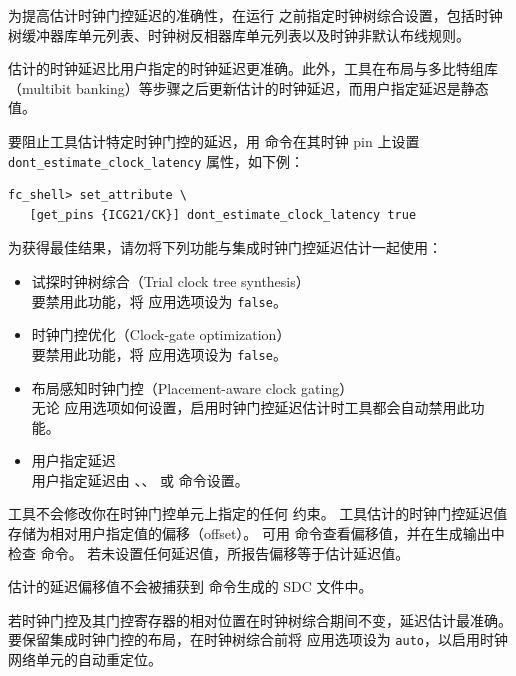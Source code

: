 为提高估计时钟门控延迟的准确性，在运行  之前指定时钟树综合设置，包括时钟树缓冲器库单元列表、时钟树反相器库单元列表以及时钟非默认布线规则。

估计的时钟延迟比用户指定的时钟延迟更准确。此外，工具在布局与多比特组库（multibit banking）等步骤之后更新估计的时钟延迟，而用户指定延迟是静态值。

要阻止工具估计特定时钟门控的延迟，用  命令在其时钟 pin 上设置 \texttt{dont\_estimate\_clock\_latency} 属性，如下例：
\begin{lstlisting}
fc_shell> set_attribute \
   [get_pins {ICG21/CK}] dont_estimate_clock_latency true
\end{lstlisting}

为获得最佳结果，请勿将下列功能与集成时钟门控延迟估计一起使用：
\begin{itemize}
  \item 试探时钟树综合（Trial clock tree synthesis）\\
    要禁用此功能，将  应用选项设为 \texttt{false}。
  \item 时钟门控优化（Clock-gate optimization）\\
    要禁用此功能，将  应用选项设为 \texttt{false}。
  \item 布局感知时钟门控（Placement-aware clock gating）\\
    无论  应用选项如何设置，启用时钟门控延迟估计时工具都会自动禁用此功能。
  \item 用户指定延迟\\
    用户指定延迟由 、、 或  命令设置。
\end{itemize}

工具不会修改你在时钟门控单元上指定的任何  约束。
工具估计的时钟门控延迟值存储为相对用户指定值的偏移（offset）。
可用  命令查看偏移值，并在生成输出中检查  命令。
若未设置任何延迟值，所报告偏移等于估计延迟值。

估计的延迟偏移值不会被捕获到  命令生成的 SDC 文件中。

若时钟门控及其门控寄存器的相对位置在时钟树综合期间不变，延迟估计最准确。
要保留集成时钟门控的布局，在时钟树综合前将  应用选项设为 \texttt{auto}，以启用时钟网络单元的自动重定位。

